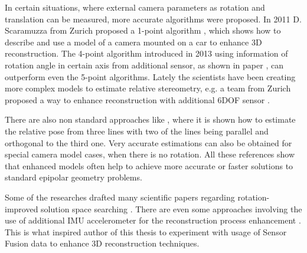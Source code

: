In certain situations, where external camera parameters as rotation and translation can be measured, more accurate algorithms were proposed.  In 2011 D. Scaramuzza from Zurich proposed a 1-point algorithm \cite{1point}, which shows how to describe and use a model of a camera mounted on a car to enhance 3D reconstruction. The 4-point algorithm introduced in 2013 using information of rotation angle in certain axis from additional sensor, as shown in paper \cite{4point}, can outperform even the 5-point algorithms. Lately the scientists have been creating more complex models to estimate relative stereometry, e.g. a team from Zurich proposed a way to enhance reconstruction with additional 6DOF sensor \cite{robustCameraImu}.

There are also non standard approaches like \cite{lineBasedPose}, where it is shown how to estimate the relative pose from three lines with two of the lines being parallel and orthogonal to the third one. Very accurate estimations can also be obtained for special camera model cases, when there is no rotation\cite{pureTransl}. All these references show that enhanced models often help to achieve more accurate or faster solutions to standard epipolar geometry problems.

Some of the researches drafted many scientific papers regarding rotation-improved solution space searching \cite{rotationSpaceSearch} \cite{Enqvist10stablestructure}. There are even some approaches involving the use of additional IMU accelerometer for the reconstruction process enhancement \cite{robustCameraImu}. This is what inspired author of this thesis to experiment with usage of Sensor Fusion data to enhance 3D reconstruction techniques.
